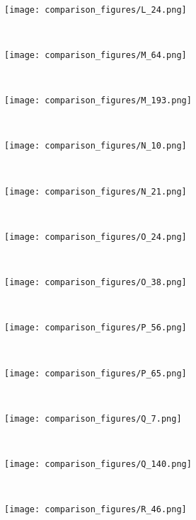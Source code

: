 \documentclass[conference]{IEEEtran}
\begin{document}
\begin{figure*}[!htbp]
    ~
    \begin{subfigure}[b]{0.15\textwidth}
        \texttt{[image: comparison\_figures/L\_24.png]}
    \end{subfigure}
    ~
    \begin{subfigure}[b]{0.15\textwidth}
        \texttt{[image: comparison\_figures/M\_64.png]}
    \end{subfigure}
    ~
    \begin{subfigure}[b]{0.15\textwidth}
        \texttt{[image: comparison\_figures/M\_193.png]}
    \end{subfigure}
    ~
    \begin{subfigure}[b]{0.15\textwidth}
        \texttt{[image: comparison\_figures/N\_10.png]}
    \end{subfigure}
    ~
    \begin{subfigure}[b]{0.15\textwidth}
        \texttt{[image: comparison\_figures/N\_21.png]}
    \end{subfigure}
    ~
    \begin{subfigure}[b]{0.15\textwidth}
        \texttt{[image: comparison\_figures/O\_24.png]}
    \end{subfigure}
    ~
    \begin{subfigure}[b]{0.15\textwidth}
        \texttt{[image: comparison\_figures/O\_38.png]}
    \end{subfigure}
    ~
    \begin{subfigure}[b]{0.15\textwidth}
        \texttt{[image: comparison\_figures/P\_56.png]}
    \end{subfigure}
    ~
    \begin{subfigure}[b]{0.15\textwidth}
        \texttt{[image: comparison\_figures/P\_65.png]}
    \end{subfigure}
    ~
    \begin{subfigure}[b]{0.15\textwidth}
        \texttt{[image: comparison\_figures/Q\_7.png]}
    \end{subfigure}
    ~
    \begin{subfigure}[b]{0.15\textwidth}
        \texttt{[image: comparison\_figures/Q\_140.png]}
    \end{subfigure}
    ~
    \begin{subfigure}[b]{0.15\textwidth}
        \texttt{[image: comparison\_figures/R\_46.png]}
    \end{subfigure}

\end{figure*}
\end{document}
